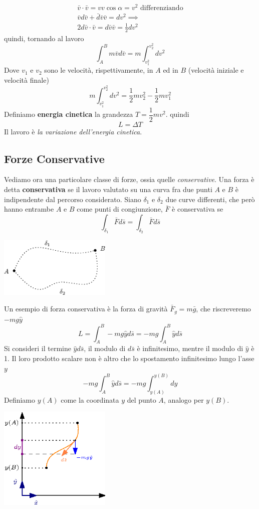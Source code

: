 \documentclass[10pt, letterpaper]{report}
\begin{document}
\begin{eqnarray}
    \bar v \cdot \bar v =  vv\cos\alpha = v^2 \text{ differenziando}\\ 
    \bar vd\bar v+\bar d\bar v\bar v=d v^2 \implies \\ 
    2d\bar v \cdot \bar v =d\bar v \bar v = \frac{1}{2}dv^2
\end{eqnarray}
quindi, tornando al lavoro
$$
    \int_A^Bm\bar vd\bar v=
    m\int_{v_1^2}^{v_2^2}dv^2
$$
Dove $v_1$ e $v_2$ sono le velocità, rispettivamente, in $A$ ed 
in $B$ (velocità iniziale e velocità finale)$$ 
m\int_{v_1^2}^{v_2^2}dv^2=\frac{1}{2}mv_2^2-\frac{1}{2}mv_1^2
$$
 Definiamo \textbf{energia cinetica} la grandezza $T=\dfrac{1}{2}mv^2$.\acc
quindi 
$$ L=\Delta T$$
Il lavoro è \textit{la variazione dell'energia cinetica}.
\subsection{Forze Conservative}
Vediamo ora una particolare classe di forze, ossia quelle 
\textit{conservative}.\acc 
{} Una forza è detta \textbf{conservativa} se il lavoro 
valutato su una curva fra due punti $A$ e $B$ è indipendente dal 
percorso considerato. Siano $\delta_1$ e $\delta_2$ due curve 
differenti, che però hanno entrambe $A$ e $B$ come punti di 
congiunzione, $\bar F$ è conservativa se 
$$ \int_{\delta_1}\bar Fd\bar s=\int_{\delta_2}\bar Fd\bar s$$
\begin{center}
    \includegraphics[width=0.4\textwidth]{images/curvePuntiUguali.eps}
\end{center}
Un esempio di forza conservativa è la forza di gravità
 $\bar F_g=m\bar g$, che riscreveremo $-mg\hat y$
 $$ L=\int_{A}^B -mg\hat y d\bar s = -mg\int_A^B \hat y d \bar s$$
Si consideri il termine $\hat y d\bar s$, il modulo di $d\bar s$ 
è infinitesimo, mentre il modulo di $\hat y$ è 1. Il loro prodotto 
scalare non è altro che lo spostamento infinitesimo lungo l'asse $y$
$$
-mg\int_A^B \hat y d \bar s = -mg\int_{y(A)}^{y(B)}dy
$$
Definiamo $y(A)$ come la coordinata $y$ del punto $A$,
analogo per $y(B)$.\begin{center}
    \includegraphics[width=0.4\textwidth]{images/gravitaConservativa.eps}
\end{center}
\end{document}
